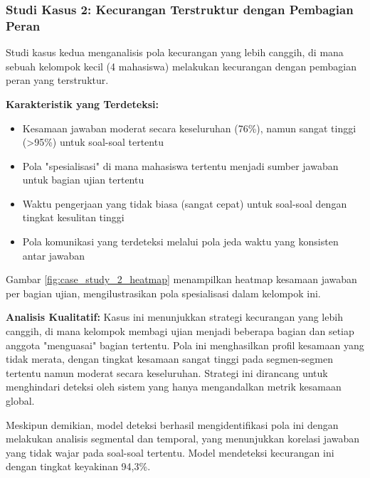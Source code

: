\subsubsection{Studi Kasus 2: Kecurangan Terstruktur dengan Pembagian Peran}

Studi kasus kedua menganalisis pola kecurangan yang lebih canggih, di mana sebuah kelompok kecil (4 mahasiswa) melakukan kecurangan dengan pembagian peran yang terstruktur.

\textbf{Karakteristik yang Terdeteksi:}
\begin{itemize}
    \item Kesamaan jawaban moderat secara keseluruhan (76\%), namun sangat tinggi (>95\%) untuk soal-soal tertentu
    \item Pola "spesialisasi" di mana mahasiswa tertentu menjadi sumber jawaban untuk bagian ujian tertentu
    \item Waktu pengerjaan yang tidak biasa (sangat cepat) untuk soal-soal dengan tingkat kesulitan tinggi
    \item Pola komunikasi yang terdeteksi melalui pola jeda waktu yang konsisten antar jawaban
\end{itemize}

Gambar \ref{fig:case_study_2_heatmap} menampilkan heatmap kesamaan jawaban per bagian ujian, mengilustrasikan pola spesialisasi dalam kelompok ini.


\textbf{Analisis Kualitatif:}
Kasus ini menunjukkan strategi kecurangan yang lebih canggih, di mana kelompok membagi ujian menjadi beberapa bagian dan setiap anggota "menguasai" bagian tertentu. Pola ini menghasilkan profil kesamaan yang tidak merata, dengan tingkat kesamaan sangat tinggi pada segmen-segmen tertentu namun moderat secara keseluruhan. Strategi ini dirancang untuk menghindari deteksi oleh sistem yang hanya mengandalkan metrik kesamaan global.

Meskipun demikian, model deteksi berhasil mengidentifikasi pola ini dengan melakukan analisis segmental dan temporal, yang menunjukkan korelasi jawaban yang tidak wajar pada soal-soal tertentu. Model mendeteksi kecurangan ini dengan tingkat keyakinan 94,3\%.

